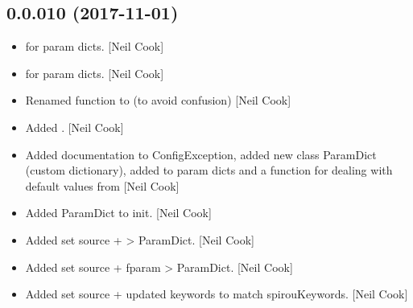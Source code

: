 \documentclass[a4paper,10pt,english]{report}
\begin{document}
\subsection{0.0.010 (2017-11-01)}
\label{\detokenize{misc/changelog:id541}}\begin{itemize}
\item {} 
 for param dicts. {[}Neil Cook{]}

\item {} 
 for param dicts. {[}Neil Cook{]}

\item {} 
Renamed  function to 
(to avoid confusion) {[}Neil Cook{]}

\item {} 
Added . {[}Neil Cook{]}

\item {} 
Added documentation to ConfigException, added new class ParamDict
(custom dictionary), added  to param dicts and a 
function for dealing with default values from  {[}Neil
Cook{]}

\item {} 
Added ParamDict to init. {[}Neil Cook{]}

\item {} 
Added set source +  \textendash{}\textgreater{} ParamDict. {[}Neil Cook{]}

\item {} 
Added set source + fparam \textendash{}\textgreater{} ParamDict. {[}Neil Cook{]}

\item {} 
Added set source + updated keywords to match spirouKeywords. {[}Neil
Cook{]}

\end{itemize}
\end{document}
